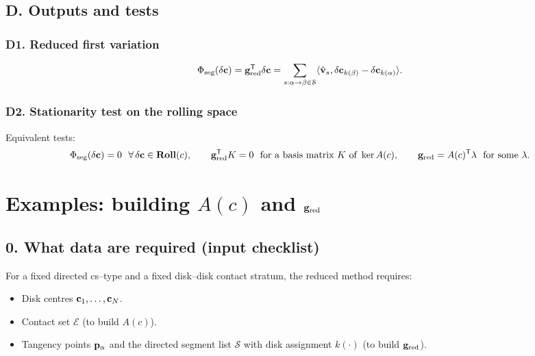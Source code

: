 \documentclass[12pt,letterpaper]{amsart}
\theoremstyle{definition}
\theoremstyle{remark}
\newcommand{\Roll}{\text{\rm \bf Roll}}
\begin{document}
\subsection{D. Outputs and tests}

\subsubsection*{D1. Reduced first variation}
\[
\Phi_{\rm seg}(\delta{\bf c})={\bf g}_{\rm red}^\mathsf T\delta{\bf c}
=\sum_{s:\alpha\to\beta\in\mathcal S}\langle \hat{\bf v}_s,\delta{\bf c}_{k(\beta)}-\delta{\bf c}_{k(\alpha)}\rangle.
\]

\subsubsection*{D2. Stationarity test on the rolling space}
Equivalent tests:
\[
\Phi_{\rm seg}(\delta{\bf c})=0\ \ \forall\,\delta{\bf c}\in\Roll(c),
\qquad
{\bf g}_{\rm red}^\mathsf T K=0\ \text{ for a basis matrix }K\text{ of }\ker A(c),
\qquad
{\bf g}_{\rm red}=A(c)^\mathsf T\lambda\ \text{ for some }\lambda.
\]


\section{Examples: building $A(c)$ and ${\bf g}_{\rm red}$}

\subsection{0. What data are required (input checklist)}

For a fixed directed cs--type and a fixed disk--disk contact stratum, the reduced method requires:
\begin{itemize}
\item Disk centres ${\bf c}_1,\dots,{\bf c}_N$.
\item Contact set $\mathcal E$ (to build $A(c)$).
\item Tangency points ${\bf p}_\alpha$ and the directed segment list $\mathcal S$ with disk assignment $k(\cdot)$ (to build ${\bf g}_{\rm red}$).
\end{itemize}
\end{document}
